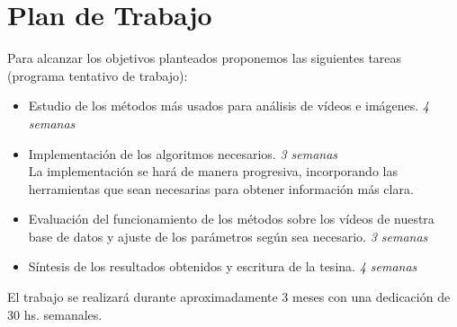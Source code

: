 \section{Plan de Trabajo}
\iffalse
Se recomienda estructurar esta sección en función de los objetivos específicos.
* Planteo de la hipotesis a analizar en cada objetivo o seccion del proyecto.
* Actividades propuestas y metodologıa a usar en cada una de ellas.
* Resultados que se esperan obtener o metas a cumplir y como se evaluaran
los resultados.
Trate de evaluar los potenciales problemas y limitaciones de la metodolog ́ıa
y t ́ecnicas propuestas y en lo posible proponer alternativas.
\fi

Para alcanzar los objetivos planteados proponemos las siguientes tareas (programa tentativo de trabajo):
\begin{itemize}
  \item Estudio de los métodos más usados para análisis de vídeos e imágenes. \textit{4 semanas}
  \item Implementación de los algoritmos necesarios. \textit{3 semanas}
    \\ La implementación se hará de manera progresiva, incorporando las herramientas que
    sean necesarias para obtener información más clara.
  \item Evaluación del funcionamiento de los métodos sobre los vídeos de nuestra base de datos y
  ajuste de los parámetros según sea necesario. \textit{3 semanas}
  \item Síntesis de los resultados obtenidos y escritura de la tesina. \textit{4 semanas}
\end{itemize}
El trabajo se realizará durante aproximadamente 3 meses con una dedicación de 30 hs. semanales.

